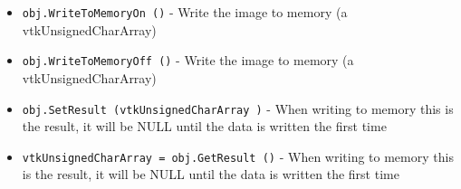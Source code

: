 \begin{itemize}
\item  \verb|obj.WriteToMemoryOn ()| -  Write the image to memory (a vtkUnsignedCharArray)

\item  \verb|obj.WriteToMemoryOff ()| -  Write the image to memory (a vtkUnsignedCharArray)

\item  \verb|obj.SetResult (vtkUnsignedCharArray )| -  When writing to memory this is the result, it will be NULL until the 
 data is written the first time

\item  \verb|vtkUnsignedCharArray = obj.GetResult ()| -  When writing to memory this is the result, it will be NULL until the 
 data is written the first time

\end{itemize}

